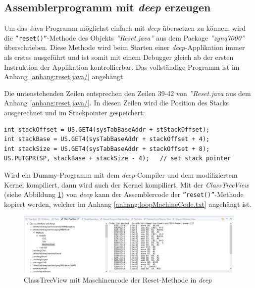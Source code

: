 \subsection{Assemblerprogramm mit \textit{deep} erzeugen}
Um das Java-Programm möglichst einfach mit \textit{deep} übersetzen zu können, wird die \texttt{''reset()''}-Methode des Objekts \textit{''Reset.java''} aus dem Package \textit{''zynq7000''} überschrieben.
Diese Methode wird beim Starten einer \textit{deep}-Applikation immer als erstes ausgeführt und ist somit mit einem Debugger gleich ab der ersten Instruktion der Applikation kontrollierbar.
Das vollständige Programm ist im Anhang \ref{anhang:reset.java/} angehängt.

Die untenstehenden Zeilen entsprechen den Zeilen 39-42 von \textit{''Reset.java} aus dem Anhang \ref{anhang:reset.java/}.
In diesen Zeilen wird die Position des Stacks ausgerechnet und im Stackpointer gespeichert:
\lstset{language=java}
\begin{lstlisting}
int stackOffset = US.GET4(sysTabBaseAddr + stStackOffset);
int stackBase = US.GET4(sysTabBaseAddr + stackOffset + 4);
int stackSize = US.GET4(sysTabBaseAddr + stackOffset + 8);
US.PUTGPR(SP, stackBase + stackSize - 4);	// set stack pointer
\end{lstlisting}

Wird ein Dummy-Programm mit dem \textit{deep}-Compiler und dem modifiziertem Kernel kompiliert, dann wird auch der Kernel kompiliert.
Mit der \textit{ClassTreeView} (siehe Abbildung \ref{fig:MaschineCode.ClassTreeView.Deep}) von \textit{deep} kann der Assemblercode der \texttt{''reset()''}-Methode kopiert werden, welcher im Anhang \ref{anhang:loopMachineCode.txt} angehängt ist.

\begin{figure}[htbp]
	\centering
		\includegraphics[width=\textwidth,height=\textheight,keepaspectratio]{images/MaschineCode_ClassTreeView_Deep.PNG}
	\caption[]{ClassTreeView mit Maschinencode der Reset-Methode in \textit{deep}}
	\label{fig:MaschineCode.ClassTreeView.Deep}
\end{figure}


